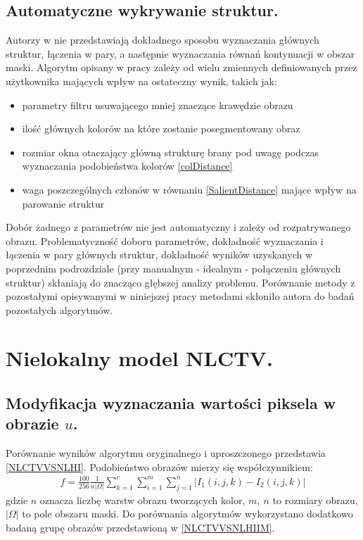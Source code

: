 \documentclass[12pt, twoside, openany]{report}
\theoremstyle{definition}
\begin{document}
\subsection{Automatyczne wykrywanie struktur.}
Autorzy w \cite{SalientStrucTexProp} nie przedstawiają dokładnego sposobu wyznaczania głównych struktur, łączenia w pary, a następnie wyznaczania równań kontynuacji w obszar maski. Algorytm opisany w pracy zależy od wielu zmiennych definiowanych przez użytkownika mających wpływ na ostateczny wynik, takich jak:
\begin{itemize}
\item parametry filtru usuwającego mniej znaczące krawędzie obrazu
\item ilość głównych kolorów na które zostanie posegmentowany obraz
\item rozmiar okna otaczający główną strukturę brany pod uwagę podczas wyznaczania podobieństwa kolorów \eqref{colDistance}
\item waga poszczególnych członów w równaniu \eqref{SalientDistance} mające wpływ na parowanie struktur
\end{itemize}
Dobór żadnego z parametrów nie jest automatyczny i zależy od rozpatrywanego obrazu. Problematyczność doboru parametrów, dokładność wyznaczania i łączenia w pary głównych struktur, dokładność wyników uzyskanych w poprzednim podrozdziale (przy manualnym - idealnym - połączeniu głównych struktur) skłaniają do znacząco głębszej analizy problemu. Porównanie metody z pozostałymi opisywanymi w niniejszej pracy metodami skłoniło autora do badań pozostałych algorytmów.
\section{Nielokalny model NLCTV.}
\subsection{Modyfikacja wyznaczania wartości piksela w obrazie $u$.}
\label{ssec:NLCTVModSec}
Porównanie wyników algorytmu oryginalnego i uproszczonego przedstawia \autoref{NLCTVVSNLHI}. Podobieństwo obrazów mierzy się współczynnikiem:
\begin{align}
f = \frac{100}{256}\frac{1}{n| \Omega |} \sum^c_{k=1}{\sum^m_{i=1}{\sum^n_{j=1}{ | I_1(i,j,k)-I_2(i,j,k) |}}} %
\end{align}
gdzie $n$ oznacza liczbę warstw obrazu tworzących kolor, $m, \ n$ to rozmiary obrazu, $|\Omega|$ to pole obszaru maski. Do porównania algorytmów wykorzystano dodatkowo badaną grupę obrazów przedstawioną w \autoref{NLCTVVSNLHIIM}.
\end{document}
